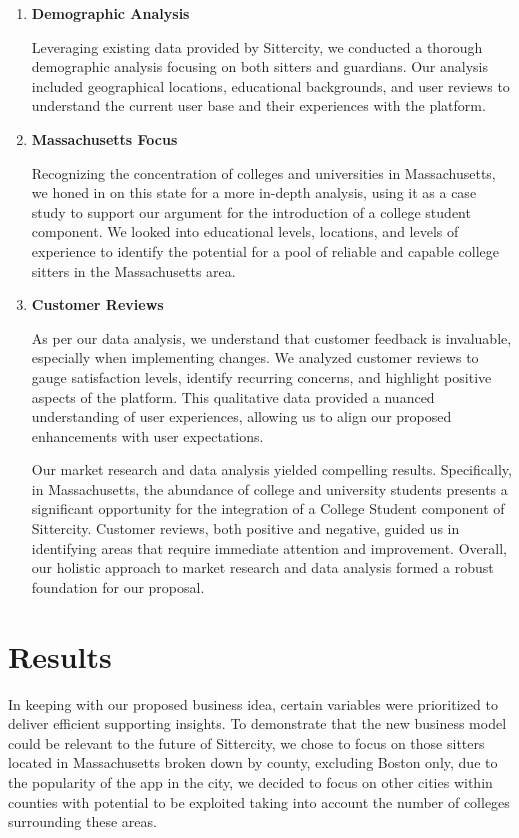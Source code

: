 \documentclass[12pt]{article}
\begin{document}
\begin{enumerate}
\def\labelenumi{\arabic{enumi}.}
\item
  \textbf{Demographic Analysis}

  Leveraging existing data provided by Sittercity, we conducted a
  thorough demographic analysis focusing on both sitters and guardians.
  Our analysis included geographical locations, educational backgrounds,
  and user reviews to understand the current user base and their
  experiences with the platform.
\item
  \textbf{Massachusetts Focus}

  Recognizing the concentration of colleges and universities in
  Massachusetts, we honed in on this state for a more in-depth analysis,
  using it as a case study to support our argument for the introduction
  of a college student component. We looked into educational levels,
  locations, and levels of experience to identify the potential for a
  pool of reliable and capable college sitters in the Massachusetts
  area.
\item
  \textbf{Customer Reviews}

  As per our data analysis, we understand that customer feedback is
  invaluable, especially when implementing changes. We analyzed customer
  reviews to gauge satisfaction levels, identify recurring concerns, and
  highlight positive aspects of the platform. This qualitative data
  provided a nuanced understanding of user experiences, allowing us to
  align our proposed enhancements with user expectations.

  Our market research and data analysis yielded compelling results.
  Specifically, in Massachusetts, the abundance of college and
  university students presents a significant opportunity for the
  integration of a College Student component of Sittercity. Customer
  reviews, both positive and negative, guided us in identifying areas
  that require immediate attention and improvement. Overall, our
  holistic approach to market research and data analysis formed a robust
  foundation for our proposal.
\end{enumerate}

\hypertarget{results}{%
\section{\texorpdfstring{\textbf{Results}}{Results}}\label{results}}

In keeping with our proposed business idea, certain variables were
prioritized to deliver efficient supporting insights. To demonstrate
that the new business model could be relevant to the future of
Sittercity, we chose to focus on those sitters located in Massachusetts
broken down by county, excluding Boston only, due to the popularity of
the app in the city, we decided to focus on other cities within counties
with potential to be exploited taking into account the number of
colleges surrounding these areas.
\end{document}
